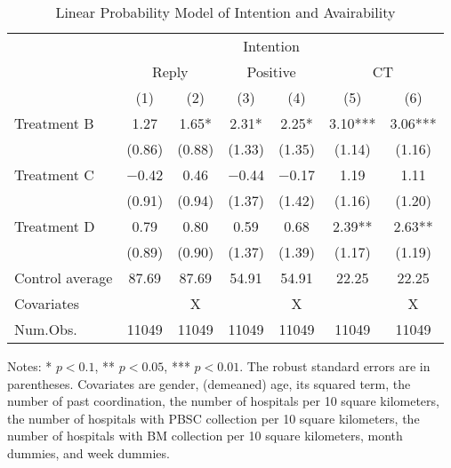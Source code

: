 \documentclass[12pt, a4paper]{article}
\begin{document}
\begin{table}

\caption{\label{tab:stock-reg}Linear Probability Model of Intention and Avairability}
\centering
\fontsize{9}{11}\selectfont
\begin{threeparttable}
\begin{tabular}[t]{lcccccc}
\toprule
\multicolumn{3}{c}{ } & \multicolumn{2}{c}{Intention} & \multicolumn{2}{c}{ } \\
\cmidrule(l{3pt}r{3pt}){4-5}
\multicolumn{1}{c}{ } & \multicolumn{2}{c}{Reply} & \multicolumn{2}{c}{Positive} & \multicolumn{2}{c}{CT} \\
\cmidrule(l{3pt}r{3pt}){2-3} \cmidrule(l{3pt}r{3pt}){4-5} \cmidrule(l{3pt}r{3pt}){6-7}
  & (1) & (2) & (3) & (4) & (5) & (6)\\
\midrule
Treatment B & \num{1.27} & \num{1.65}* & \num{2.31}* & \num{2.25}* & \num{3.10}*** & \num{3.06}***\\
 & (\num{0.86}) & (\num{0.88}) & (\num{1.33}) & (\num{1.35}) & (\num{1.14}) & (\num{1.16})\\
Treatment C & \num{-0.42} & \num{0.46} & \num{-0.44} & \num{-0.17} & \num{1.19} & \num{1.11}\\
 & (\num{0.91}) & (\num{0.94}) & (\num{1.37}) & (\num{1.42}) & (\num{1.16}) & (\num{1.20})\\
Treatment D & \num{0.79} & \num{0.80} & \num{0.59} & \num{0.68} & \num{2.39}** & \num{2.63}**\\
 & (\num{0.89}) & (\num{0.90}) & (\num{1.37}) & (\num{1.39}) & (\num{1.17}) & (\num{1.19})\\
\midrule
Control average & 87.69 & 87.69 & 54.91 & 54.91 & 22.25 & 22.25\\
Covariates &  & X &  & X &  & X\\
Num.Obs. & \num{11049} & \num{11049} & \num{11049} & \num{11049} & \num{11049} & \num{11049}\\
\bottomrule
\end{tabular}
\begin{tablenotes}
\item Notes: * $p < 0.1$, ** $p < 0.05$, *** $p < 0.01$. The robust standard errors are in parentheses. Covariates are gender, (demeaned) age, its squared term, the number of past coordination, the number of hospitals per 10 square kilometers, the number of hospitals with PBSC collection per 10 square kilometers, the number of hospitals with BM collection per 10 square kilometers, month dummies, and week dummies.
\end{tablenotes}
\end{threeparttable}
\end{table}
\end{document}
